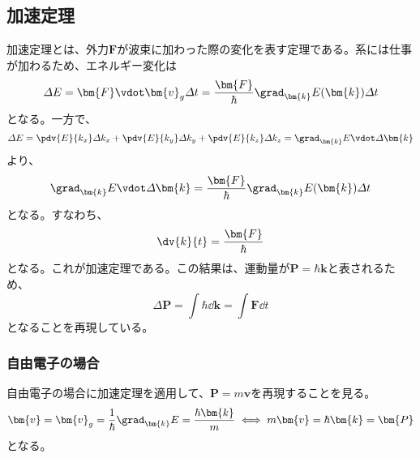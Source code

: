 \subsection{加速定理}
加速定理とは、外力$\bm{F}$が波束に加わった際の変化を表す定理である。系には仕事が加わるため、エネルギー変化は
\begin{equation}
	\varDelta{}E = \bm{F}\vdot\bm{v}_g\varDelta{}t = \frac{\bm{F}}{\hbar}\grad_{\bm{k}}E(\bm{k})\varDelta{}t
\end{equation}
となる。一方で、
\begin{equation}
	\varDelta{}E = \pdv{E}{k_x}\varDelta{}k_x + \pdv{E}{k_y}\varDelta{}k_y + \pdv{E}{k_z}\varDelta{}k_z = \grad_{\bm{k}}{E}\vdot\varDelta\bm{k}
\end{equation}
より、
\begin{equation}
	\grad_{\bm{k}}{E}\vdot\varDelta\bm{k} = \frac{\bm{F}}{\hbar}\grad_{\bm{k}}E(\bm{k})\varDelta{}t
\end{equation}
となる。すなわち、
\begin{equation}
	\dv{k}{t} = \frac{\bm{F}}{\hbar}
\end{equation}
となる。これが加速定理である。この結果は、運動量が$\bm{P} = \hbar\bm{k}$と表されるため、
\begin{equation}
	\varDelta\bm{P} = \int\hbar\dd{\bm{k}} = \int \bm{F}\dd{t}
\end{equation}
となることを再現している。
\subsubsection*{自由電子の場合}
自由電子の場合に加速定理を適用して、$\bm{P} = m\bm{v}$を再現することを見る。
\begin{equation}
	\bm{v} = \bm{v}_g = \frac{1}{\hbar}\grad_{\bm{k}}{E} = \frac{\hbar\bm{k}}{m} \iff m\bm{v} = \hbar\bm{k} = \bm{P}
\end{equation}
となる。
